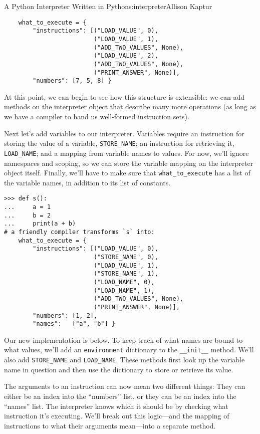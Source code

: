 \begin{aosachapter}{A Python Interpreter Written in Python}{s:interpreter}{Allison Kaptur}
\begin{verbatim}
    what_to_execute = {
        "instructions": [("LOAD_VALUE", 0),
                         ("LOAD_VALUE", 1),
                         ("ADD_TWO_VALUES", None),
                         ("LOAD_VALUE", 2),
                         ("ADD_TWO_VALUES", None),
                         ("PRINT_ANSWER", None)],
        "numbers": [7, 5, 8] }
\end{verbatim}

At this point, we can begin to see how this structure is extensible: we
can add methods on the interpreter object that describe many more
operations (as long as we have a compiler to hand us well-formed
instruction sets).

\label{variables}

Next let's add variables to our interpreter. Variables require an
instruction for storing the value of a variable, \texttt{STORE\_NAME};
an instruction for retrieving it, \texttt{LOAD\_NAME}; and a mapping
from variable names to values. For now, we'll ignore namespaces and
scoping, so we can store the variable mapping on the interpreter object
itself. Finally, we'll have to make sure that \texttt{what\_to\_execute}
has a list of the variable names, in addition to its list of constants.

\begin{verbatim}
>>> def s():
...     a = 1
...     b = 2
...     print(a + b)
# a friendly compiler transforms `s` into:
    what_to_execute = {
        "instructions": [("LOAD_VALUE", 0),
                         ("STORE_NAME", 0),
                         ("LOAD_VALUE", 1),
                         ("STORE_NAME", 1),
                         ("LOAD_NAME", 0),
                         ("LOAD_NAME", 1),
                         ("ADD_TWO_VALUES", None),
                         ("PRINT_ANSWER", None)],
        "numbers": [1, 2],
        "names":   ["a", "b"] }
\end{verbatim}

Our new implementation is below. To keep track of what names are bound
to what values, we'll add an \texttt{environment} dictionary to the
\texttt{\_\_init\_\_} method. We'll also add \texttt{STORE\_NAME} and
\texttt{LOAD\_NAME}. These methods first look up the variable name in
question and then use the dictionary to store or retrieve its value.

The arguments to an instruction can now mean two different things: They
can either be an index into the ``numbers'' list, or they can be an
index into the ``names'' list. The interpreter knows which it should be
by checking what instruction it's executing. We'll break out this
logic---and the mapping of instructions to what their arguments
mean---into a separate method.


\end{aosachapter}
